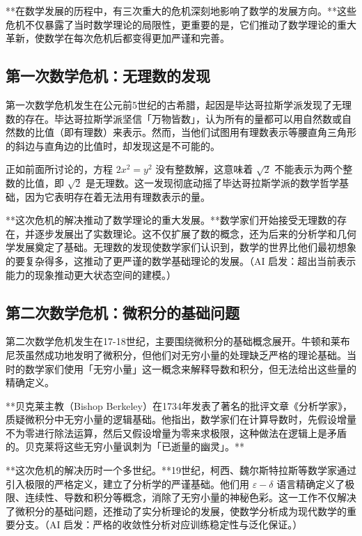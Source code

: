 **在数学发展的历程中，有三次重大的危机深刻地影响了数学的发展方向。**这些危机不仅暴露了当时数学理论的局限性，更重要的是，它们推动了数学理论的重大革新，使数学在每次危机后都变得更加严谨和完善。

\subsection{第一次数学危机：无理数的发现}

第一次数学危机发生在公元前5世纪的古希腊，起因是毕达哥拉斯学派发现了无理数的存在。毕达哥拉斯学派坚信「万物皆数」，认为所有的量都可以用自然数或自然数的比值（即有理数）来表示。然而，当他们试图用有理数表示等腰直角三角形的斜边与直角边的比值时，却发现这是不可能的。

正如前面所讨论的，方程 $2x^2 = y^2$ 没有整数解，这意味着 $\sqrt{2}$ 不能表示为两个整数的比值，即 $\sqrt{2}$ 是无理数。这一发现彻底动摇了毕达哥拉斯学派的数学哲学基础，因为它表明存在着无法用有理数表示的量。

**这次危机的解决推动了数学理论的重大发展。**数学家们开始接受无理数的存在，并逐步发展出了实数理论。这不仅扩展了数的概念，还为后来的分析学和几何学发展奠定了基础。无理数的发现使数学家们认识到，数学的世界比他们最初想象的要复杂得多，这推动了更严谨的数学基础理论的发展。{（AI 启发：超出当前表示能力的现象推动更大状态空间的建模。）}

\subsection{第二次数学危机：微积分的基础问题}

第二次数学危机发生在17-18世纪，主要围绕微积分的基础概念展开。牛顿和莱布尼茨虽然成功地发明了微积分，但他们对无穷小量的处理缺乏严格的理论基础。当时的数学家们使用「无穷小量」这一概念来解释导数和积分，但无法给出这些量的精确定义。

**贝克莱主教（Bishop Berkeley）在1734年发表了著名的批评文章《分析学家》，质疑微积分中无穷小量的逻辑基础。他指出，数学家们在计算导数时，先假设增量不为零进行除法运算，然后又假设增量为零来求极限，这种做法在逻辑上是矛盾的。贝克莱将这些无穷小量讽刺为「已逝量的幽灵」。**

**这次危机的解决历时一个多世纪。**19世纪，柯西、魏尔斯特拉斯等数学家通过引入极限的严格定义，建立了分析学的严谨基础。他们用 $\varepsilon-\delta$ 语言精确定义了极限、连续性、导数和积分等概念，消除了无穷小量的神秘色彩。这一工作不仅解决了微积分的基础问题，还推动了实分析理论的发展，使数学分析成为现代数学的重要分支。{（AI 启发：严格的收敛性分析对应训练稳定性与泛化保证。）}

